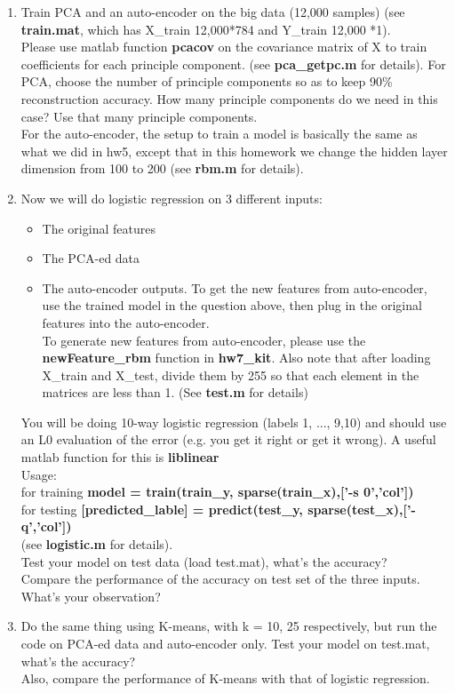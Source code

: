 \begin{enumerate}
\item Train PCA and an auto-encoder on the big data  (12,000 samples) (see {\bf train.mat}, which has X\_train 12,000*784 and Y\_train 12,000 *1). \\
Please use matlab function {\bf pcacov} on the covariance matrix of X to train coefficients for each principle component. (see {\bf pca\_getpc.m} for details).
For PCA, choose the number of principle components so as to keep 90\% reconstruction accuracy. How many principle components do we need in this case? Use that many principle components. \\
For the auto-encoder, the setup to train a model is basically the same as what we did in hw5, except that in this homework we change the hidden layer dimension from 100 to 200 (see {\bf rbm.m} for details). \\ 


\item Now we will do logistic regression on 3 different inputs:\\
\begin{itemize}
\item The original features
\item The PCA-ed data
\item The auto-encoder outputs. To get the new features from auto-encoder, use the trained model in the question above, then plug in the original features into the auto-encoder. \\
To generate new features from auto-encoder, please use the \textbf{newFeature\_rbm} function in \textbf{hw7\_kit}.
Also note that after loading X\_train and X\_test, divide them by 255 so that each element in the matrices are less than 1. (See \textbf{test.m} for details)
\end{itemize}
You will be doing 10-way logistic regression (labels 1, ..., 9,10) and should use an L0 evaluation of the error (e.g. you get it right or get it wrong).  A useful matlab function for this is {\bf liblinear}\\
Usage: \\
for training \textbf{model = train(train\_y, sparse(train\_x),['-s 0','col'])}\\
for testing  \textbf{[predicted\_lable] = predict(test\_y, sparse(test\_x),['-q','col'])}\\
(see {\bf logistic.m} for details). \\ 
Test your model on test data (load test.mat), what's the accuracy? \\
Compare the performance of the accuracy on test set of the three inputs. What's your observation?

\item Do the same thing using K-means, with k = 10, 25 respectively, but run the code on PCA-ed data and auto-encoder only. Test your model on test.mat, what's the accuracy? \\
Also, compare the performance of K-means with that of logistic regression.

\end{enumerate}
